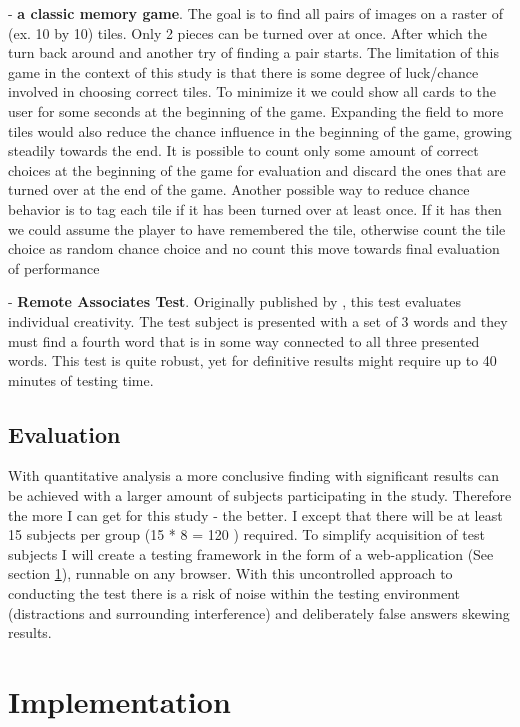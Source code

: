 - \textbf{a classic memory game}. The goal is to find all pairs of images on a raster of (ex. 10 by 10) tiles. 
Only 2 pieces can be turned over at once. 
After which the turn back around and another try of finding a pair starts. 
The limitation of this game in the context of this study is that there is some degree of luck/chance involved in choosing correct tiles. 
To minimize it we could show all cards to the user for some seconds at the beginning of the game.
Expanding the field to more tiles would also reduce the chance influence in the beginning of the game, growing steadily towards the end.
It is possible to count only some amount of correct choices at the beginning of the game for evaluation and discard the ones that are turned over at the end of the game.
Another possible way to reduce chance behavior is to tag each tile if it has been turned over at least once. If it has then we could assume the player to have remembered the tile, otherwise count the tile choice as random chance choice and no count this move towards final evaluation of performance

- \textbf{Remote Associates Test}. Originally published by \cite[p.226 ff]{Mednick1962}, this test evaluates individual creativity. 
The test subject is presented with a set of 3 words and they must find a fourth word that is in some way connected to all three presented words.
This test is quite robust, yet for definitive results might require up to 40 minutes of testing time.

\subsection{Evaluation}

With quantitative analysis a more conclusive finding with significant results can be achieved with a larger amount of subjects participating in the study. 
Therefore the more I can get for this study - the better. 
I except that there will be at least 15 subjects per group (15 * 8 = 120 ) required.
To simplify acquisition of test subjects I will create a testing framework in the form of a web-application (See section \ref{implementation}), runnable on any browser.
With this uncontrolled approach to conducting the test there is a risk of noise within the testing environment (distractions and surrounding interference) and deliberately false answers skewing results.

\section{Implementation} \label{implementation}

